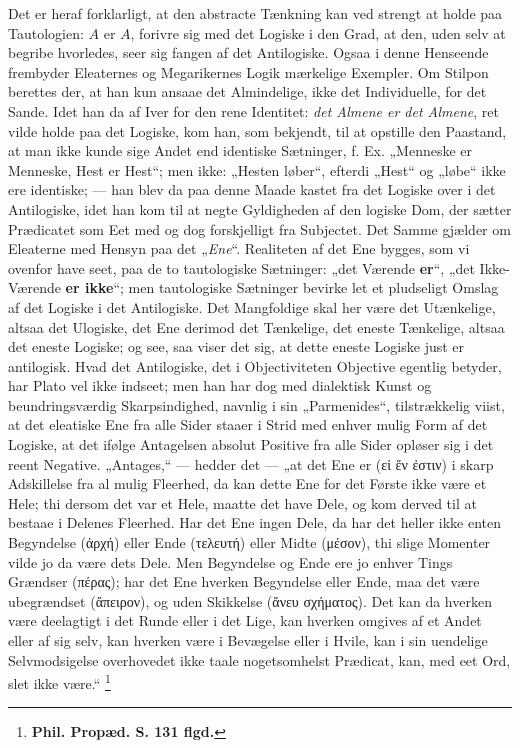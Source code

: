 \documentclass[11pt]{book}
\newcommand{\opage}[1]{\marginnote{\footnotesize\textit{[#1]}}}
\begin{document}
Det er heraf forklarligt, at den abstracte Tænkning kan ved strengt
at holde paa Tautologien: $A$ er $A$, forivre sig med det Logiske i
den Grad, at den, uden selv at begribe hvorledes, seer sig fangen af
det Antilogiske. Ogsaa i denne Henseende frembyder Eleaternes og
Megarikernes Logik mærkelige Exempler. Om Stilpon berettes der, at han
kun ansaae det Almindelige, ikke det Individuelle, for det Sande. Idet
han da af Iver for den rene Identitet: \emph{det Almene er det
Almene}, ret vilde holde paa det Logiske, kom han, som bekjendt, til
at opstille den Paastand, at man ikke kunde sige Andet end identiske
Sætninger, f. Ex. „Menneske er Menneske, Hest er Hest“; men ikke:
„Hesten løber“, efterdi „Hest“ og „løbe“ ikke ere identiske; --- han
blev da paa denne Maade kastet fra det Logiske over i det Antilogiske,
idet han kom til at negte Gyldigheden af den logiske Dom, der sætter
Prædicatet som Eet med og dog forskjelligt fra Subjectet. Det Samme
gjælder om Eleaterne med Hensyn paa det „\emph{Ene}“. Realiteten af
det Ene bygges, som vi ovenfor have seet, paa de to tautologiske
Sætninger: „det Værende \textbf{er}“, „det Ikke-Værende \textbf{er
ikke}“; men tautologiske Sætninger bevirke let et pludseligt Omslag af
det Logiske i det Antilogiske. Det
\opage{157} \setcounter{footnote}{0}%
Mangfoldige skal her være det Utænkelige, altsaa det Ulogiske, det
Ene derimod det Tænkelige, det eneste Tænkelige, altsaa det eneste
Logiske; og see, saa viser det sig, at dette eneste Logiske just er
antilogisk. Hvad det Antilogiske, det i Objectiviteten Objective
egentlig betyder, har Plato vel ikke indseet; men han har dog med
dialektisk Kunst og beundringsværdig Skarpsindighed, navnlig i sin
„Parmenides“, tilstrækkelig viist, at det eleatiske Ene fra alle Sider
staaer i Strid med enhver mulig Form af det Logiske, at det ifølge
Antagelsen absolut Positive fra alle Sider opløser sig i det reent
Negative. „Antages,“ --- hedder det --- „at det Ene er (εἰ ἕν ἐστιν)
i skarp Adskillelse fra al mulig Fleerhed, da kan dette Ene for det
Første ikke være et Hele; thi dersom det var et Hele, maatte det have
Dele, og kom derved til at bestaae i Delenes Fleerhed. Har det Ene
ingen Dele, da har det heller ikke enten Begyndelse (ἀρχή) eller Ende
(τελευτή) eller Midte (μέσον), thi slige Momenter vilde jo da være
dets Dele. Men Begyndelse og Ende ere jo enhver Tings Grændser
(πέρας); har det Ene hverken Begyndelse eller Ende, maa det være
ubegrændset (ἄπειρον), og uden Skikkelse (ἄνευ σχήματος). Det kan da
hverken være deelagtigt i det Runde eller i det Lige, kan hverken
omgives af et Andet eller af sig selv, kan hverken være i Bevægelse
eller i Hvile, kan i sin uendelige Selvmodsigelse overhovedet ikke
taale nogetsomhelst Prædicat, kan, med eet Ord, slet ikke være.“%
\footnote{%
\textbf{Phil. Propæd. S. 131 flgd.}}
\end{document}
